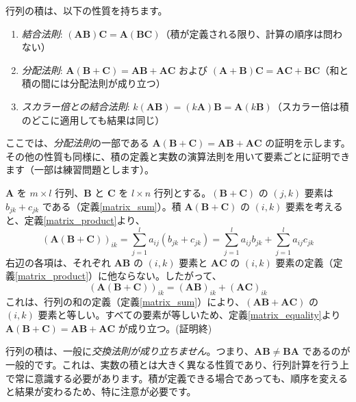 \begin{thm}[行列の積の性質] \label{matrix_product_property}
行列の積は、以下の性質を持ちます。
\begin{enumerate}
\item \emph{結合法則}: $(\bm{A}\bm{B})\bm{C} = \bm{A}(\bm{B}\bm{C})$（積が定義される限り、計算の順序は問わない）
\item \emph{分配法則}: $\bm{A}(\bm{B} + \bm{C}) = \bm{A}\bm{B} + \bm{A}\bm{C}$ および $(\bm{A} + \bm{B})\bm{C} = \bm{A}\bm{C} + \bm{B}\bm{C}$（和と積の間には分配法則が成り立つ）
\item \emph{スカラー倍との結合法則}: $k(\bm{A}\bm{B}) = (k\bm{A})\bm{B} = \bm{A}(k\bm{B})$（スカラー倍は積のどこに適用しても結果は同じ）
\end{enumerate}
\begin{proof*}
ここでは、\emph{分配法則}の一部である $\bm{A}(\bm{B} + \bm{C}) = \bm{A}\bm{B} + \bm{A}\bm{C}$ の証明を示します。その他の性質も同様に、積の定義と実数の演算法則を用いて要素ごとに証明できます（一部は練習問題とします）。\par
$\bm{A}$ を $m \times l$ 行列、$\bm{B}$ と $\bm{C}$ を $l \times n$ 行列とする。$(\bm{B} + \bm{C})$ の $(j,k)$ 要素は $b_{jk} + c_{jk}$ である（定義\ref{matrix_sum}）。積 $\bm{A}(\bm{B} + \bm{C})$ の $(i,k)$ 要素を考えると、定義\ref{matrix_product}より、
\[(\bm{A}(\bm{B} + \bm{C}))_{ik} = \sum_{j=1}^{l} a_{ij}(b_{jk} + c_{jk})= \sum_{j=1}^{l} a_{ij}b_{jk} + \sum_{j=1}^{l} a_{ij}c_{jk}\]
右辺の各項は、それぞれ $\bm{A}\bm{B}$ の $(i,k)$ 要素と $\bm{A}\bm{C}$ の $(i,k)$ 要素の定義（定義\ref{matrix_product}）に他ならない。したがって、
\[(\bm{A}(\bm{B} + \bm{C}))_{ik} = (\bm{A}\bm{B})_{ik} + (\bm{A}\bm{C})_{ik}\]
これは、行列の和の定義（定義\ref{matrix_sum}）により、$(\bm{A}\bm{B} + \bm{A}\bm{C})$ の $(i,k)$ 要素と等しい。すべての要素が等しいため、定義\ref{matrix_equality}より $\bm{A}(\bm{B} + \bm{C}) = \bm{A}\bm{B} + \bm{A}\bm{C}$ が成り立つ。(証明終)
\end{proof*}
\end{thm}

\begin{rmk*}
行列の積は、一般に\emph{交換法則が成り立ちません}。つまり、$\bm{A}\bm{B} \neq \bm{B}\bm{A}$ であるのが一般的です。これは、実数の積とは大きく異なる性質であり、行列計算を行う上で常に意識する必要があります。積が定義できる場合であっても、順序を変えると結果が変わるため、特に注意が必要です。
\end{rmk*}

